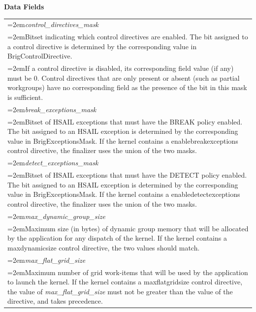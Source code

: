 \documentclass[final,oneside]{book}
\newcommand{\reffld}[1]{\textit{#1}}
\begin{document}
\noindent\textbf{Data Fields}\\[-7mm]
\begin{longtable}{@{}>{\hangindent=2em}p{\textwidth}}
\hypertarget{hsa_\-ext_\-control_\-directives_\-t.control_\-directives_\-mask}{\reffld{control_\-directives_\-mask}}\\\hspace{2em}Bitset indicating which control directives are enabled. The bit assigned to a control directive is determined by the corresponding value in BrigControlDirective.\\[1.25mm]
\hspace{2em}If a control directive is disabled, its corresponding field value (if any) must be 0. Control directives that are only present or absent (such as partial workgroups) have no corresponding field as the presence of the bit in this mask is sufficient.\\[2mm]
\hypertarget{hsa_\-ext_\-control_\-directives_\-t.break_\-exceptions_\-mask}{\reffld{break_\-exceptions_\-mask}}\\\hspace{2em}Bitset of HSAIL exceptions that must have the BREAK policy enabled. The bit assigned to an HSAIL exception is determined by the corresponding value in BrigExceptionsMask. If the kernel contains a enablebreakexceptions control directive, the finalizer uses the union of the two masks.\\[2mm]
\hypertarget{hsa_\-ext_\-control_\-directives_\-t.detect_\-exceptions_\-mask}{\reffld{detect_\-exceptions_\-mask}}\\\hspace{2em}Bitset of HSAIL exceptions that must have the DETECT policy enabled. The bit assigned to an HSAIL exception is determined by the corresponding value in BrigExceptionsMask. If the kernel contains a enabledetectexceptions control directive, the finalizer uses the union of the two masks.\\[2mm]
\hypertarget{hsa_\-ext_\-control_\-directives_\-t.max_\-dynamic_\-group_\-size}{\reffld{max_\-dynamic_\-group_\-size}}\\\hspace{2em}Maximum size (in bytes) of dynamic group memory that will be allocated by the application for any dispatch of the kernel. If the kernel contains a maxdynamicsize control directive, the two values should match.\\[2mm]
\hypertarget{hsa_\-ext_\-control_\-directives_\-t.max_\-flat_\-grid_\-size}{\reffld{max_\-flat_\-grid_\-size}}\\\hspace{2em}Maximum number of grid work-items that will be used by the application to launch the kernel. If the kernel contains a maxflatgridsize control directive, the value of \textit{max_\-flat_\-grid_\-size} must not be greater than the value of the directive, and takes precedence.\\[1.25mm]

\end{longtable}
\end{document}
